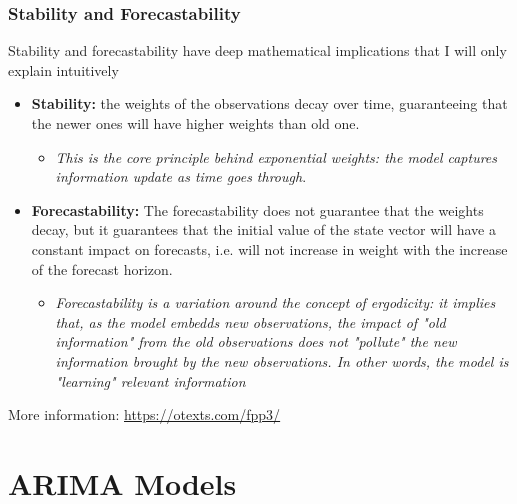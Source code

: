 \documentclass{beamer}
\newenvironment{wideitemize}{\itemize\addtolength{\itemsep}{10pt}}{\enditemize}
\begin{document}
\begin{frame}
  \frametitle{Stability and Forecastability}
  \begin{wideitemize}
  \item Stability and forecastability have deep mathematical implications that I will only explain intuitively\\

    \smallskip
    
    \begin{itemize}
    \item \textbf{Stability:} the weights of the observations decay over time, guaranteeing that the newer ones will have higher weights than old one.
      \begin{itemize}
      \item \emph{This is the core principle behind exponential weights: the model captures information update as time goes through}. 
      \end{itemize}

      \smallskip
      
    \item \textbf{Forecastability:} The forecastability does not guarantee that the weights decay, but it guarantees that the initial value of the state vector will have a constant impact on forecasts, i.e. will not increase in weight with the increase of the forecast horizon.
      \begin{itemize}
      \item \emph{Forecastability is a variation around the concept of ergodicity: it implies that, as the model embedds new observations, the impact of "old information" from the old observations does not "pollute" the new information brought by the new observations. In other words, the model is "learning" relevant information }
      \end{itemize}
    \end{itemize}
    \item More information: \url{https://otexts.com/fpp3/}
  \end{wideitemize}
\end{frame}


\section{ARIMA Models}
\end{document}
